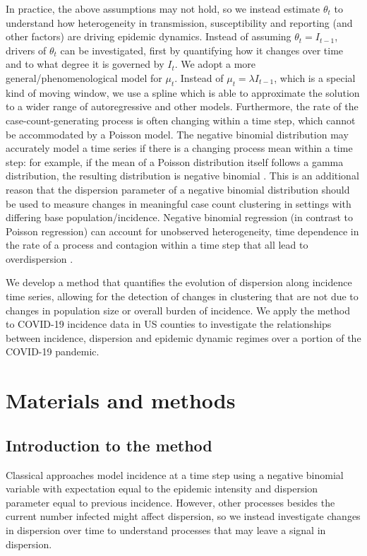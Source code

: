 \documentclass[10pt,letterpaper]{article}
\begin{document}
In practice, the above assumptions may not hold, so we instead estimate $\theta_t$ to understand how heterogeneity in transmission, susceptibility and reporting (and other factors) are driving epidemic dynamics. 
Instead of assuming $\theta_t = I_{t-1}$, drivers of $\theta_t$ can be investigated, first by quantifying how it changes over time and to what degree it is governed by $I_t$. 
We adopt a more general/phenomenological model for $\mu_t$. 
Instead of $\mu_t = \lambda I_{t-1}$, which is a special kind of moving window, we use a spline which is able to approximate the solution to a wider range of autoregressive and other models. 
Furthermore, the rate of the case-count-generating process is often changing within a time step, which cannot be accommodated by a Poisson model. 
The negative binomial distribution may accurately model a time series if there is a changing process mean within a time step: for example, if the mean of a Poisson distribution itself follows a gamma distribution, the resulting distribution is negative binomial \cite{cook_notes_nodate}. 
This is an additional reason that the dispersion parameter of a negative binomial distribution should be used to measure changes in meaningful case count clustering in settings with differing base population/incidence. 
Negative binomial regression (in contrast to Poisson regression) can account for unobserved heterogeneity, time dependence in the rate of a process and contagion within a time step that all lead to overdispersion \cite{barron_analysis_1992}.

We develop a method that quantifies the evolution of dispersion along incidence time series, allowing for the detection of changes in clustering that are not due to changes in population size or overall burden of incidence.
We apply the method to COVID-19 incidence data in US counties to investigate the relationships between incidence, dispersion and epidemic dynamic regimes over a portion of the COVID-19 pandemic. 

\section*{Materials and methods}
\subsection*{Introduction to the method}

Classical approaches \cite{grenfell_dynamics_2002} model incidence at a time step using a negative binomial variable with expectation equal to the epidemic intensity and dispersion parameter equal to previous incidence. However, other processes besides the current number infected might affect dispersion, so we instead investigate changes in dispersion over time to understand processes that may leave a signal in dispersion. 
\end{document}
